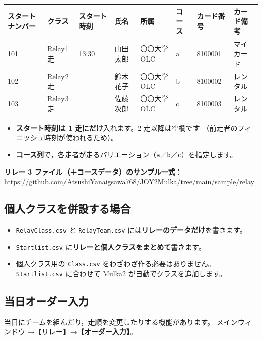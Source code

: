\begin{center}
\small
\begin{tabular}{@{}llllllll@{}}
\toprule
スタートナンバー & クラス & スタート時刻 & 氏名 & 所属 & コース & カード番号 & カード備考 \\
\midrule
101 & Relay1走 & 13:30 & 山田 太郎 & 〇〇大学OLC & a & 8100001 & マイカード \\
102 & Relay2走 & & 鈴木 花子 & 〇〇大学OLC & b & 8100002 & レンタル \\
103 & Relay3走 & & 佐藤 次郎 & 〇〇大学OLC & c & 8100003 & レンタル \\
\bottomrule
\end{tabular}
\end{center}

\begin{itemize}
\item \textbf{スタート時刻は 1 走にだけ}入れます。2 走以降は空欄です
      （前走者のフィニッシュ時刻が使われるため）。
\item \textbf{コース列}で，各走者が走るバリエーション（\texttt{a}／\texttt{b}／\texttt{c}）を指定します。
\end{itemize}

\textbf{リレー 3 ファイル（＋コースデータ）のサンプル一式}：\\
\url{https://github.com/AtsushiYanaigsawa768/JOY2Mulka/tree/main/sample/relay}

\subsection*{個人クラスを併設する場合}

\begin{itemize}
\item \texttt{RelayClass.csv} と \texttt{RelayTeam.csv} には\textbf{リレーのデータだけ}を書きます。
\item \texttt{Startlist.csv} に\textbf{リレーと個人クラスをまとめて}書きます。
\item 個人クラス用の \texttt{Class.csv} をわざわざ作る必要はありません。
      \texttt{Startlist.csv} に合わせて Mulka2 が自動でクラスを追加します。
\end{itemize}

\subsection*{当日オーダー入力}

当日にチームを組んだり，走順を変更したりする機能があります。
メインウィンドウ →【リレー】→\textbf{【オーダー入力】}。\ver

